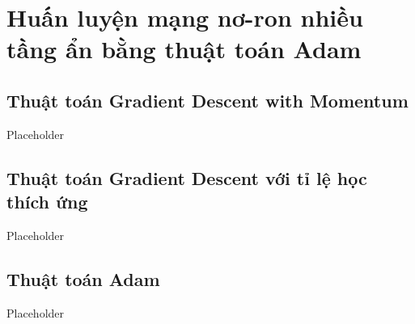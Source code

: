 \chapter{Huấn luyện mạng nơ-ron nhiều tầng ẩn bằng thuật toán Adam}
\label{Chapter3}

\section{Thuật toán Gradient Descent with Momentum}

Placeholder

\section{Thuật toán Gradient Descent với tỉ lệ học thích ứng}

Placeholder

\section{Thuật toán Adam}

Placeholder